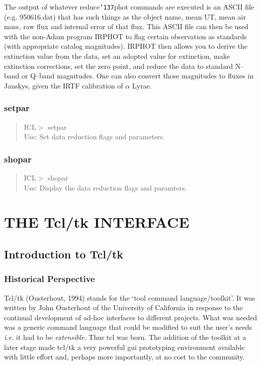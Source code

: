 \documentclass[a4paper]{book}
\newcommand{\stardocinitials}  {SUN}
\newcommand{\stardocnumber}    {206.1}
\newcommand{\stardocname}{\stardocinitials /\stardocnumber}
\renewcommand{\_}{{\tt\char'137}}
\begin{document}
The output of whatever reduce\_phot commands are executed is an ASCII
file
(e.g. 950616.dat) that has such things as the object name, mean UT,
mean air mass, raw flux and internal error of that flux.  This ASCII file
can then be used with the non-Adam program IRPHOT to flag certain
observation as standards (with appropriate catalog magnitudes).  IRPHOT
then allows you to derive the extinction value from the data, set an
adopted value for extinction, make extinction corrections, set the
zero point, and reduce the data to standard N--band or Q--band magnitudes.
One can also convert those magnitudes to fluxes in Janskys, given the
IRTF calibration of $\alpha$ Lyrae.

\section{setpar}
\begin{quote}
ICL$>$ setpar \\
Use: Set data reduction flags and parameters. \\
\end{quote}

\section{shopar}
\begin{quote}
ICL$>$ shopar \\
Use: Display the data reduction flags and paramters. \\
\end{quote}


\part{THE Tcl/tk INTERFACE}
\pagestyle{myheadings}
\markboth{Tcl/tk Interface}{\stardocname}

\chapter{Introduction to Tcl/tk}
\section{Historical Perspective}
Tcl/tk (Ousterhout, 1994) stands for the `tool command language/toolkit'.
It was written by John Ousterhout of the University of California in
response to the continual development of ad-hoc interfaces to different
projects. What was needed was a generic command language that could be
modified to suit the user's needs {\em i.e.} it had to be {\em
extensible}. Thus tcl was born. The addition of the toolkit at a later
stage made tcl/tk a very powerful {\sc gui} prototyping environment available
with little effort and, perhaps more importantly, at no cost to the
community.
\end{document}
